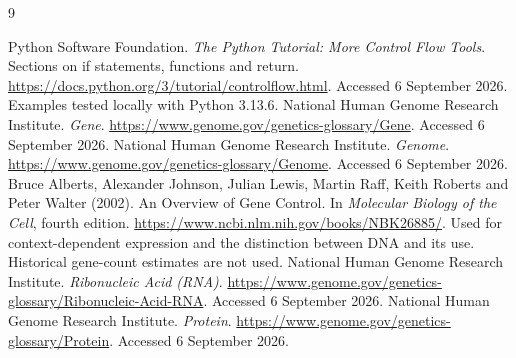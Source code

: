 \begin{thebibliography}{9}
\raggedright
{} Python Software Foundation.
\emph{The Python Tutorial: More Control Flow Tools}. Sections on if statements, functions and return.
\url{https://docs.python.org/3/tutorial/controlflow.html}.
Accessed 6 September 2026. Examples tested locally with Python 3.13.6.
 National Human Genome Research Institute.
\emph{Gene}.
\url{https://www.genome.gov/genetics-glossary/Gene}.
Accessed 6 September 2026.
 National Human Genome Research Institute.
\emph{Genome}.
\url{https://www.genome.gov/genetics-glossary/Genome}.
Accessed 6 September 2026.
 Bruce Alberts, Alexander Johnson, Julian Lewis, Martin Raff, Keith Roberts and Peter Walter (2002).
An Overview of Gene Control. In \emph{Molecular Biology of the Cell}, fourth edition.
\url{https://www.ncbi.nlm.nih.gov/books/NBK26885/}.
Used for context-dependent expression and the distinction between DNA and its use. Historical gene-count estimates are not used.
 National Human Genome Research Institute.
\emph{Ribonucleic Acid (RNA)}.
\url{https://www.genome.gov/genetics-glossary/Ribonucleic-Acid-RNA}.
Accessed 6 September 2026.
 National Human Genome Research Institute.
\emph{Protein}.
\url{https://www.genome.gov/genetics-glossary/Protein}.
Accessed 6 September 2026.
\end{thebibliography}
